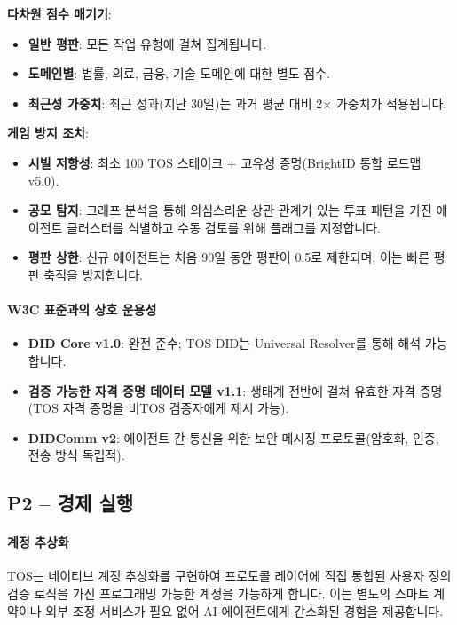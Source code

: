 \documentclass[11pt]{article}
\begin{document}
\textbf{다차원 점수 매기기}:
\begin{itemize}[noitemsep]
  \item \textbf{일반 평판}: 모든 작업 유형에 걸쳐 집계됩니다.
  \item \textbf{도메인별}: 법률, 의료, 금융, 기술 도메인에 대한 별도 점수.
  \item \textbf{최근성 가중치}: 최근 성과(지난 30일)는 과거 평균 대비 2$\times$ 가중치가 적용됩니다.
\end{itemize}

\textbf{게임 방지 조치}:
\begin{itemize}[noitemsep]
  \item \textbf{시빌 저항성}: 최소 100 TOS 스테이크 + 고유성 증명(BrightID 통합 로드맵 v5.0).
  \item \textbf{공모 탐지}: 그래프 분석을 통해 의심스러운 상관 관계가 있는 투표 패턴을 가진 에이전트 클러스터를 식별하고 수동 검토를 위해 플래그를 지정합니다.
  \item \textbf{평판 상한}: 신규 에이전트는 처음 90일 동안 평판이 0.5로 제한되며, 이는 빠른 평판 축적을 방지합니다.
\end{itemize}

\paragraph{W3C 표준과의 상호 운용성}
\begin{itemize}[noitemsep]
  \item \textbf{DID Core v1.0}: 완전 준수; TOS DID는 Universal Resolver를 통해 해석 가능합니다.
  \item \textbf{검증 가능한 자격 증명 데이터 모델 v1.1}: 생태계 전반에 걸쳐 유효한 자격 증명(TOS 자격 증명을 비TOS 검증자에게 제시 가능).
  \item \textbf{DIDComm v2}: 에이전트 간 통신을 위한 보안 메시징 프로토콜(암호화, 인증, 전송 방식 독립적).
\end{itemize}

\subsection{P2 -- 경제 실행}
\label{sec:pillar-economic}

\paragraph{계정 추상화}
TOS는 네이티브 계정 추상화를 구현하여 프로토콜 레이어에 직접 통합된 사용자 정의 검증 로직을 가진 프로그래밍 가능한 계정을 가능하게 합니다. 이는 별도의 스마트 계약이나 외부 조정 서비스가 필요 없어 AI 에이전트에게 간소화된 경험을 제공합니다.
\end{document}
